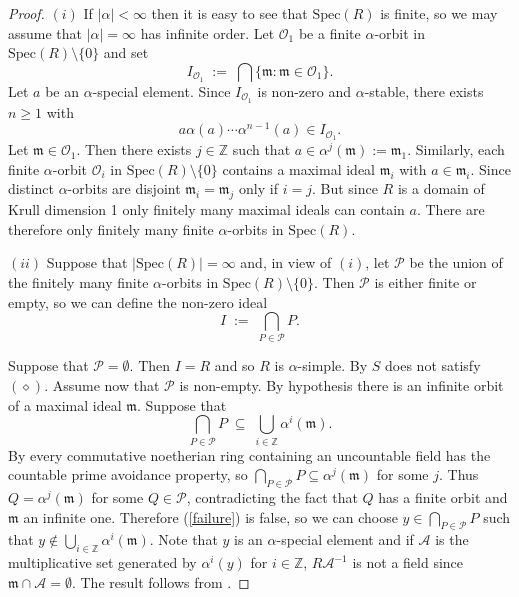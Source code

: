 \documentclass[a4paper, 11pt]{article}
\theoremstyle{definition}
\newcommand{\Z}{\mathbb{Z}}
\begin{document}
\begin{proof}$(i)$ If $|\alpha| < \infty$ then it is easy to see that $\mathrm{Spec}(R)$ is finite, so we may assume that $|\alpha| = \infty$ has infinite order.  Let $\mathcal{O}_1$ be a finite $\alpha$-orbit in $\mathrm{Spec}(R)\setminus \{0\}$  and set $$I_{\mathcal{O}_1} \; := \; \bigcap\{\mathfrak{m} : \mathfrak{m} \in \mathcal{O}_1\}.$$
Let $a $ be an $\alpha$-special element. Since $I_{\mathcal{O}_1}$ is non-zero and $\alpha$-stable, there exists $n \geq 1$ with
$$ a\alpha(a) \cdots \alpha^{n-1}(a) \in I_{\mathcal{O}_1}.$$
Let $\mathfrak{m} \in \mathcal{O}_1$. Then there exists $j \in \mathbb{Z}$ such that $a \in \alpha^j(\mathfrak{m}) := \mathfrak{m}_1$. Similarly, each finite $\alpha$-orbit $\mathcal{O}_i$ in $\mathrm{Spec}(R)\setminus \{0\}$ contains a maximal ideal $\mathfrak{m}_i$ with $a \in \mathfrak{m}_i$. Since distinct $\alpha$-orbits are disjoint $\mathfrak{m}_i = \mathfrak{m}_j$ only if $i = j$. But since $R$ is a domain of Krull dimension 1 only finitely many maximal ideals can contain $a$. There are therefore only finitely many finite $\alpha$-orbits in $\mathrm{Spec}(R)$.

\medskip

\noindent $(ii)$ Suppose that $|\mathrm{Spec}(R)| = \infty$ and, in view of $(i)$, let $\mathcal{P}$ be the union of the finitely many finite $\alpha$-orbits in $\mathrm{Spec}(R)\setminus \{0\}$. Then $\mathcal{P}$ is either finite or empty, so we can define the non-zero ideal
$$ I \; := \; \bigcap_{P \in \mathcal{P}}P.$$

\noindent Suppose that $\mathcal{P}=\emptyset$. Then  $I=R$ and so $R$ is $\alpha$-simple. By \cite[Proposition 4.10]{BCM} $S$ does not satisfy $(\diamond)$. Assume now that $\mathcal{P}$ is non-empty. By hypothesis there is an infinite orbit of a maximal ideal $\mathfrak{m}$. Suppose that
\begin{equation}\label{failure}\bigcap_{P \in \mathcal{P}}P\; \subseteq \; \bigcup_{i\in\Z} \alpha^i(\mathfrak{m}).
\end{equation} 
By \cite[Proposition 2.5]{SharpVamos} every commutative noetherian ring containing an uncountable field has the countable prime avoidance property, so $\bigcap_{P \in \mathcal{P}}P\subseteq \alpha^j(\mathfrak{m})$ for some $j$. Thus $Q=\alpha^j(\mathfrak{m})$ for some $Q \in \mathcal{P}$, contradicting the fact that $Q$ has a finite orbit and $\mathfrak{m}$ an infinite one. Therefore (\ref{failure}) is false, so we can choose $y\in \bigcap_{P \in \mathcal{P}}P$ such that $y\notin \bigcup_{i\in\Z}\alpha^i(\mathfrak{m})$. Note that $y$ is an $\alpha$-special element and if $\mathcal A$ is the multiplicative set generated by $\alpha^i(y)$ for $i\in\Z$, $R{\mathcal A}^{-1}$ is not a field since $\mathfrak{m}\cap {\mathcal A}=\emptyset$. The result follows from \cite[Proposition 5.3]{BCM}.


\end{proof}
\end{document}
